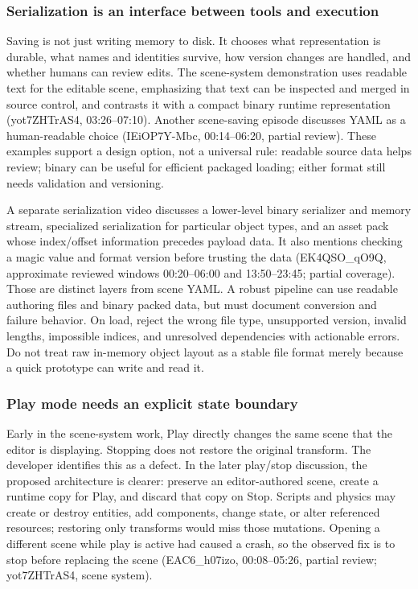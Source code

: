 \subsubsection{Serialization is an interface between tools and execution}\label{serialization-is-an-interface-between-tools-and-execution}

Saving is not just writing memory to disk. It chooses what representation is durable, what names and identities survive, how version changes are handled, and whether humans can review edits. The scene-system demonstration uses readable text for the editable scene, emphasizing that text can be inspected and merged in source control, and contrasts it with a compact binary runtime representation (yot7ZHTrAS4, 03:26--07:10). Another scene-saving episode discusses YAML as a human-readable choice (IEiOP7Y-Mbc, 00:14--06:20, partial review). These examples support a design option, not a universal rule: readable source data helps review; binary can be useful for efficient packaged loading; either format still needs validation and versioning.

A separate serialization video discusses a lower-level binary serializer and memory stream, specialized serialization for particular object types, and an asset pack whose index/offset information precedes payload data. It also mentions checking a magic value and format version before trusting the data (EK4QSO\_qO9Q, approximate reviewed windows 00:20--06:00 and 13:50--23:45; partial coverage). Those are distinct layers from scene YAML. A robust pipeline can use readable authoring files and binary packed data, but must document conversion and failure behavior. On load, reject the wrong file type, unsupported version, invalid lengths, impossible indices, and unresolved dependencies with actionable errors. Do not treat raw in-memory object layout as a stable file format merely because a quick prototype can write and read it.

\subsubsection{Play mode needs an explicit state boundary}\label{play-mode-needs-an-explicit-state-boundary}

Early in the scene-system work, Play directly changes the same scene that the editor is displaying. Stopping does not restore the original transform. The developer identifies this as a defect. In the later play/stop discussion, the proposed architecture is clearer: preserve an editor-authored scene, create a runtime copy for Play, and discard that copy on Stop. Scripts and physics may create or destroy entities, add components, change state, or alter referenced resources; restoring only transforms would miss those mutations. Opening a different scene while play is active had caused a crash, so the observed fix is to stop before replacing the scene (EAC6\_h07izo, 00:08--05:26, partial review; yot7ZHTrAS4, scene system).

